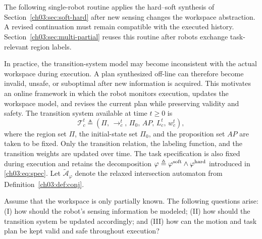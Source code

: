 \begingroup\color{blue}
\section{}
\label{ch03:sec:partial}

\begin{revision}
The following single-robot routine applies the hard--soft synthesis of
Section~\ref{ch03:sec:soft-hard} after new sensing changes the workspace
abstraction. A revised continuation must remain compatible with the executed
history. Section~\ref{ch03:sec:multi-partial} reuses this routine after robots
exchange task-relevant region labels.
\end{revision}

In practice, the transition-system model may become inconsistent with the
actual workspace during execution. A plan synthesized off-line can therefore
become invalid, unsafe, or suboptimal after new information is acquired. This
motivates an online framework in which the robot monitors execution, updates the
workspace model, and revises the current plan while preserving validity and
safety. The transition system available at time $t \geq 0$ is
\begin{equation}\label{ch03:eq:t-FTS}
\mathcal{T}_c^t\triangleq (\Pi,\, \longrightarrow_c^t,\, \Pi_0,\,AP,\, L_c^t,\, w_c^t),
\end{equation}
where the region set $\Pi$, the initial-state set $\Pi_0$, and the
proposition set $AP$ are taken to be fixed. Only the transition relation, the
labeling function, and the transition weights are updated over time. The task specification is also fixed
during execution and retains the decomposition
$\varphi \triangleq
\varphi^{\textup{soft}} \wedge \varphi^{\textup{hard}}$
introduced in \eqref{ch03:eq:spec}. Let
$\tilde{\mathcal{A}}_{\varphi}$ denote the relaxed intersection automaton from
Definition~\ref{ch03:def:conj}.

\begin{problem}
Assume that the workspace is only partially known. The following questions
arise: (I) how should the robot's sensing information be modeled;
(II) how should the transition system be updated accordingly;
and (III) how can the motion and task plan be kept valid and safe throughout execution?
\end{problem}

